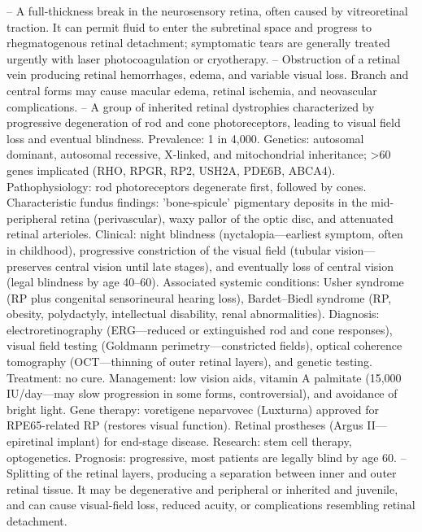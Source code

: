 -- A full-thickness break in the neurosensory retina, often caused by vitreoretinal traction. It can permit fluid to enter the subretinal space and progress to rhegmatogenous retinal detachment; symptomatic tears are generally treated urgently with laser photocoagulation or cryotherapy.
-- Obstruction of a retinal vein producing retinal hemorrhages, edema, and variable visual loss. Branch and central forms may cause macular edema, retinal ischemia, and neovascular complications.
-- A group of inherited retinal dystrophies characterized by progressive degeneration of rod and cone photoreceptors, leading to visual field loss and eventual blindness. Prevalence: 1 in 4,000. Genetics: autosomal dominant, autosomal recessive, X-linked, and mitochondrial inheritance; >60 genes implicated (RHO, RPGR, RP2, USH2A, PDE6B, ABCA4). Pathophysiology: rod photoreceptors degenerate first, followed by cones. Characteristic fundus findings: 'bone-spicule' pigmentary deposits in the mid-peripheral retina (perivascular), waxy pallor of the optic disc, and attenuated retinal arterioles. Clinical: night blindness (nyctalopia—earliest symptom, often in childhood), progressive constriction of the visual field (tubular vision—preserves central vision until late stages), and eventually loss of central vision (legal blindness by age 40--60). Associated systemic conditions: Usher syndrome (RP plus congenital sensorineural hearing loss), Bardet–Biedl syndrome (RP, obesity, polydactyly, intellectual disability, renal abnormalities). Diagnosis: electroretinography (ERG—reduced or extinguished rod and cone responses), visual field testing (Goldmann perimetry—constricted fields), optical coherence tomography (OCT—thinning of outer retinal layers), and genetic testing. Treatment: no cure. Management: low vision aids, vitamin A palmitate (15,000 IU/day—may slow progression in some forms, controversial), and avoidance of bright light. Gene therapy: voretigene neparvovec (Luxturna) approved for RPE65-related RP (restores visual function). Retinal prostheses (Argus II—epiretinal implant) for end-stage disease. Research: stem cell therapy, optogenetics. Prognosis: progressive, most patients are legally blind by age 60.
-- Splitting of the retinal layers, producing a separation between inner and outer retinal tissue. It may be degenerative and peripheral or inherited and juvenile, and can cause visual-field loss, reduced acuity, or complications resembling retinal detachment.
